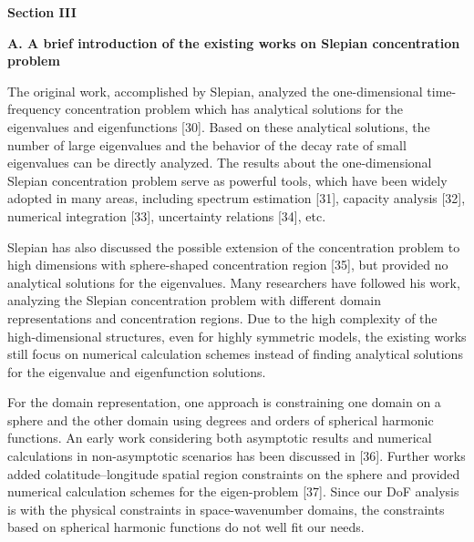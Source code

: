 \documentclass[a4paper,12pt]{article}
\begin{document}
\begin{framed}
	{\bf Section III}
	
	{\bf {\color{red} A. A brief introduction of the existing works on Slepian concentration problem}}

   	{\color{red}
   	\quad The original work, accomplished by Slepian, analyzed the one-dimensional time-frequency concentration problem which has analytical solutions for the eigenvalues and eigenfunctions [30]. Based on these analytical solutions, the number of large eigenvalues and the behavior of the decay rate of small eigenvalues can be directly analyzed. The results about the one-dimensional Slepian concentration problem serve as powerful tools, which have been widely adopted in many areas, including spectrum estimation [31], capacity analysis [32], numerical integration [33], uncertainty relations [34], etc.
   	
   	\quad Slepian has also discussed the possible extension of the concentration problem to high dimensions with sphere-shaped concentration region [35], but provided no analytical solutions for the eigenvalues. Many researchers have followed his work, analyzing the Slepian concentration problem with different domain representations and concentration regions. Due to the high complexity of the high-dimensional structures, even for highly symmetric models, the existing works still focus on numerical calculation schemes instead of finding analytical solutions for the eigenvalue and eigenfunction solutions. 
   	
   	\quad For the domain representation, one approach is constraining one domain on a sphere and the other domain using degrees and orders of spherical harmonic functions. An early work considering both asymptotic results and numerical calculations in non-asymptotic scenarios has been discussed in [36]. Further works added colatitude–longitude spatial region constraints on the sphere and provided numerical calculation schemes for the eigen-problem [37]. Since our DoF analysis is with the physical constraints in space-wavenumber domains, the constraints based on spherical harmonic functions do not well fit our needs. 
   	
}
\end{framed}
\end{document}
